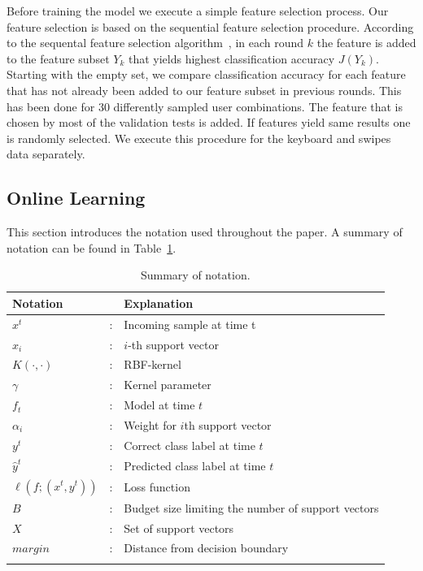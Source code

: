 \documentclass{llncs}
\begin{document}
Before training the model we execute a simple feature selection process. Our feature selection is based on the sequential feature selection procedure. According to the sequental feature selection algorithm~\cite{ruckstiess2011sequential}, in each round $k$ the feature is added to the feature subset $Y_k$ that yields highest classification accuracy $J( Y_k )$. Starting with the empty set, we compare classification accuracy for each feature that has not already been added to our feature subset in previous rounds. This has been done for 30 differently sampled user combinations. The feature that is chosen by most of the validation tests is added. If features yield same results one is randomly selected. We execute this procedure for the keyboard and swipes data separately.


\subsection{Online Learning}

This section introduces the notation used throughout the paper. A summary of notation can be found in Table~\ref{tbl:notation}.

\begin{table}
\centering
\begin{tabular}{lll}
	\toprule
	\textbf{Notation}       &   & \textbf{Explanation}                               \\ \midrule
	$x^{t}$                 & : & Incoming sample at time t                          \\
	$x_{i}$                 & : & $i$-th support vector                               \\
	$K(\cdot,\cdot)$        & : & RBF-kernel                                         \\
	$\gamma$                & : & Kernel parameter                                   \\
	$f_{t}$                 & : & Model at time $t$                                  \\
	$\alpha_{i}$            & : & Weight for $i$th support vector                    \\
	$y^{t}$                 & : & Correct class label at time $t$                    \\
	$\hat{{y}}^{t}$         & : & Predicted class label at time $t$                  \\
	$\ell(f;(x^{t},y^{t}))$ & : & Loss function                                      \\
	$B$                     & : & Budget size limiting the number of support vectors \\
	$X$                     & : & Set of support vectors                             \\
	$margin$                & : & Distance from decision boundary                    \\ \bottomrule \\
\end{tabular}
\caption{Summary of notation.}
\label{tbl:notation}
\end{table}
\end{document}

